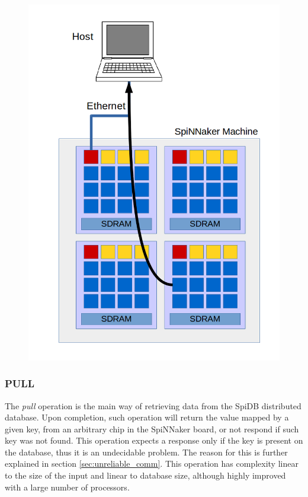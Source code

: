 \begin{figure}
\begin{minipage}{.32\textwidth}
  \includegraphics[width=1\linewidth, natwidth=794, natheight=1123]{images/put3.png}
  \label{fig:leaf-host}
\end{minipage}
\end{figure}

\subsubsection{PULL}
The \textit{pull} operation is the main way of retrieving data from the SpiDB distributed database. 
Upon completion, such operation will return the value mapped by a given key, from an arbitrary chip in the SpiNNaker board, or not respond if such key was not found. This operation expects a response only if the key is present on the database, thus it is an undecidable problem. The reason for this is further explained in section \ref{sec:unreliable_comm}. This operation has complexity linear to the size of the input and linear to database size, although highly improved with a large number of processors.

